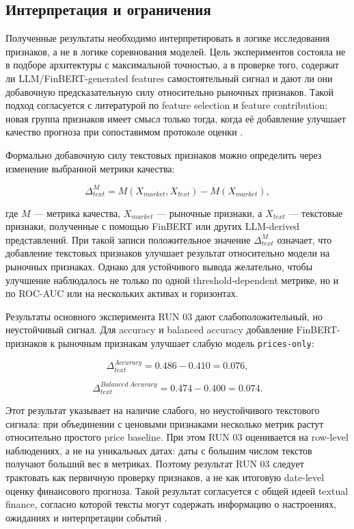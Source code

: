 \subsection{Интерпретация и ограничения}

Полученные результаты необходимо интерпретировать в логике исследования признаков, а не в логике соревнования моделей. Цель экспериментов состояла не в подборе архитектуры с максимальной точностью, а в проверке того, содержат ли LLM/FinBERT-generated features самостоятельный сигнал и дают ли они добавочную предсказательную силу относительно рыночных признаков. Такой подход согласуется с литературой по feature selection и feature contribution: новая группа признаков имеет смысл только тогда, когда её добавление улучшает качество прогноза при сопоставимом протоколе оценки \cite{guyon2003feature}.

Формально добавочную силу текстовых признаков можно определить через изменение выбранной метрики качества:

\[
\Delta_{text}^{M} = M(X_{market}, X_{text}) - M(X_{market}),
\]

где $M$ --- метрика качества, $X_{market}$ --- рыночные признаки, а $X_{text}$ --- текстовые признаки, полученные с помощью FinBERT или других LLM-derived представлений. При такой записи положительное значение $\Delta_{text}^{M}$ означает, что добавление текстовых признаков улучшает результат относительно модели на рыночных признаках. Однако для устойчивого вывода желательно, чтобы улучшение наблюдалось не только по одной threshold-dependent метрике, но и по ROC-AUC или на нескольких активах и горизонтах.

Результаты основного эксперимента RUN 03 дают слабоположительный, но неустойчивый сигнал. Для accuracy и balanced accuracy добавление FinBERT-признаков к рыночным признакам улучшает слабую модель \texttt{prices-only}:

\[
\Delta_{text}^{Accuracy} = 0.486 - 0.410 = 0.076,
\]

\[
\Delta_{text}^{Balanced\ Accuracy} = 0.474 - 0.400 = 0.074.
\]

Этот результат указывает на наличие слабого, но неустойчивого текстового сигнала: при объединении с ценовыми признаками несколько метрик растут относительно простого price baseline. При этом RUN 03 оценивается на row-level наблюдениях, а не на уникальных датах: даты с большим числом текстов получают больший вес в метриках. Поэтому результат RUN 03 следует трактовать как первичную проверку признаков, а не как итоговую date-level оценку финансового прогноза. Такой результат согласуется с общей идеей textual finance, согласно которой тексты могут содержать информацию о настроениях, ожиданиях и интерпретации событий \cite{tetlock2007media,loughran2011liability,kearney2014textual,nassirtoussi2014text}.

